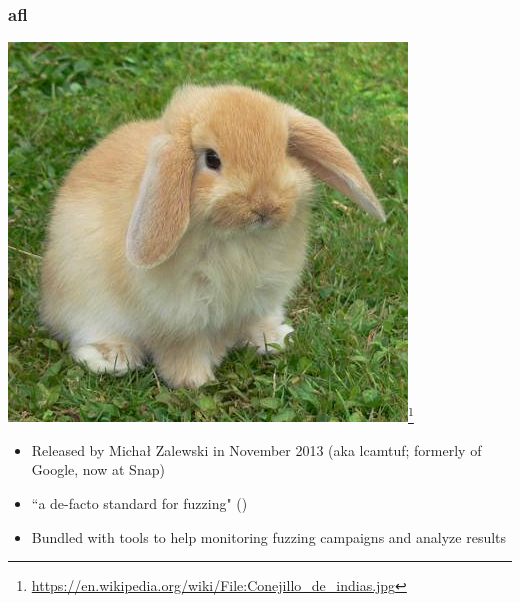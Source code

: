 \documentclass{beamer}
\begin{document}
\begin{frame}
	\frametitle{afl \cite{afl}}
	\centering \includegraphics[scale=.35]{rabbit}\footnote{\url{https://en.wikipedia.org/wiki/File:Conejillo\_de\_indias.jpg}}
	
	\begin{itemize}
		\item {Released by Micha\l{} Zalewski in November 2013 (aka lcamtuf; formerly of Google, now at Snap)}
	
		\item{``a de-facto standard for fuzzing" (\cite{dissecting_afl})}

		\item{Bundled with tools to help monitoring fuzzing campaigns and analyze results}
	\end{itemize}
\end{frame}
\end{document}
